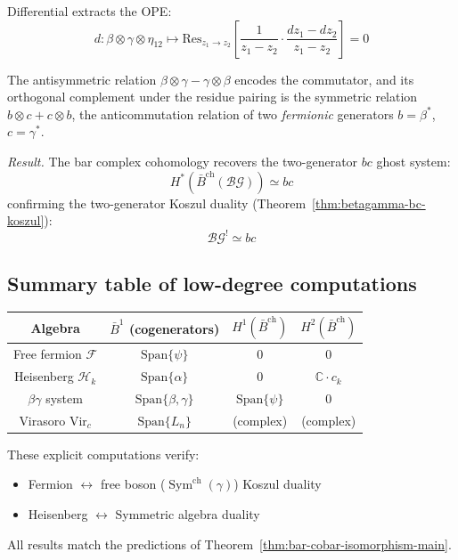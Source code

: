 Differential extracts the OPE:
\[d: \beta \otimes \gamma \otimes \eta_{12} \mapsto
   \text{Res}_{z_1 \to z_2}\left[\frac{1}{z_1-z_2} \cdot \frac{dz_1-dz_2}{z_1-z_2}\right] = 0\]

The antisymmetric relation $\beta \otimes \gamma - \gamma \otimes \beta$ encodes the commutator, and
its orthogonal complement under the residue pairing is the symmetric relation $b \otimes c + c \otimes b$,
the anticommutation relation of two \emph{fermionic} generators $b = \beta^*$, $c = \gamma^*$.

\emph{Result.} The bar complex cohomology recovers the two-generator $bc$ ghost system:
\[H^*(\bar{B}^{\text{ch}}(\mathcal{BG})) \simeq bc\]
confirming the two-generator Koszul duality (Theorem~\ref{thm:betagamma-bc-koszul}):
\[\mathcal{BG}^! \simeq bc\]

\subsection{Summary table of low-degree computations}

\begin{center}
\begin{tabular}{c|c|c|c}
\textbf{Algebra} & $\bar{B}^1$ (cogenerators) & $H^1(\bar{B}^{\mathrm{ch}})$ & $H^2(\bar{B}^{\mathrm{ch}})$ \\ \hline
Free fermion $\mathcal{F}$ & $\text{Span}\{\psi\}$ & 0 & 0 \\
Heisenberg $\mathcal{H}_k$ & $\text{Span}\{\alpha\}$ & 0 & $\mathbb{C} \cdot c_k$ \\
$\beta\gamma$ system & $\text{Span}\{\beta,\gamma\}$ & $\text{Span}\{\psi\}$ & 0 \\
Virasoro $\text{Vir}_c$ & $\text{Span}\{L_n\}$ & (complex) & (complex)
\end{tabular}
\end{center}

These explicit computations verify:
\begin{itemize}
\item Fermion $\leftrightarrow$ free boson ($\operatorname{Sym}^{\mathrm{ch}}(\gamma)$) Koszul duality
\item Heisenberg $\leftrightarrow$ Symmetric algebra duality
\end{itemize}

All results match the predictions of Theorem~\ref{thm:bar-cobar-isomorphism-main}.
